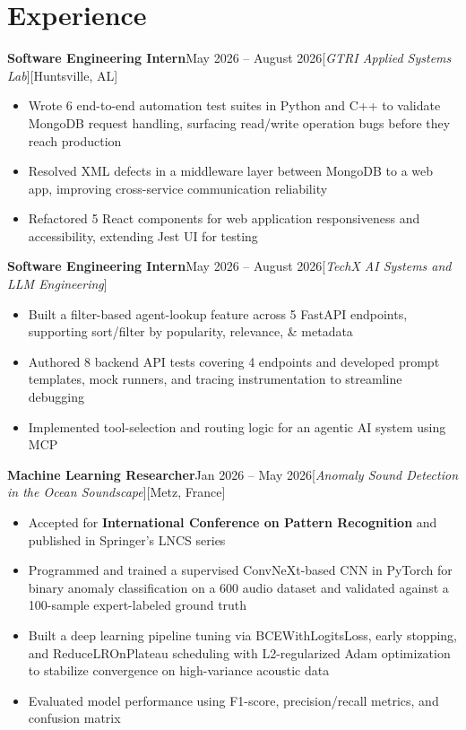 \documentclass[letterpaper,10.5pt]{article}
\newcommand{\resumeItem}[1]{
  \item \small{#1 \vspace{-1pt}}
}
\newcommand{\resumeItemListStart}{
  \begin{itemize}[
    leftmargin=1.5em,
    itemsep=1pt,
    topsep=2pt,
    parsep=0pt
  ]
}
\newcommand{\resumeItemListEnd}{\end{itemize}\vspace{-3pt}}
\begin{document}

\section{\textbf{Experience}}
     \begin{itemize}[leftmargin=*,nosep]
      \resumeProjectHeading
         {\textbf{Software Engineering Intern}}{May 2026 -- August 2026}[\textit{GTRI Applied Systems Lab}][Huntsville, AL]
          \resumeItemListStart
            \resumeItem{Wrote 6 end-to-end automation test suites in Python and C++ to validate MongoDB request handling, surfacing read/write operation bugs before they reach production}
            \resumeItem{Resolved XML defects in a middleware layer between MongoDB to a web app, improving cross-service communication reliability}
            \resumeItem{Refactored 5 React components for web application responsiveness and accessibility, extending Jest UI for testing}
          \resumeItemListEnd
    \end{itemize}
     \begin{itemize}[leftmargin=*,nosep]
      \resumeProjectHeading
          {\textbf{Software Engineering Intern}}{May 2026 -- August 2026}[\textit{TechX AI Systems and LLM Engineering}]
          \resumeItemListStart
            \resumeItem{Built a filter-based agent-lookup feature across 5 FastAPI endpoints, supporting sort/filter by popularity, relevance, \& metadata}
            \resumeItem{Authored 8 backend API tests covering 4 endpoints and developed prompt templates, mock runners, and tracing instrumentation to streamline debugging}
            \resumeItem{Implemented tool-selection and routing logic for an agentic AI system using MCP}
          \resumeItemListEnd
    \end{itemize}
    \begin{itemize}[leftmargin=*,nosep]
          \resumeProjectHeading
              {\textbf{Machine Learning Researcher}}{Jan 2026 -- May 2026}[\textit{Anomaly Sound Detection in the Ocean Soundscape}][Metz, France]
              \resumeItemListStart
                \resumeItem{Accepted for \textbf{International Conference on Pattern Recognition} and published in Springer’s LNCS series}
                \resumeItem{Programmed and trained a supervised ConvNeXt-based CNN in PyTorch for binary anomaly classification on a 600 audio dataset and validated against a 100-sample expert-labeled ground truth}
                \resumeItem{Built a deep learning pipeline tuning via BCEWithLogitsLoss, early stopping, and ReduceLROnPlateau scheduling with L2-regularized Adam optimization to stabilize convergence on high-variance acoustic data}
                \resumeItem{Evaluated model performance using F1-score, precision/recall metrics, and confusion matrix}
              \resumeItemListEnd
    \end{itemize}
\end{document}
